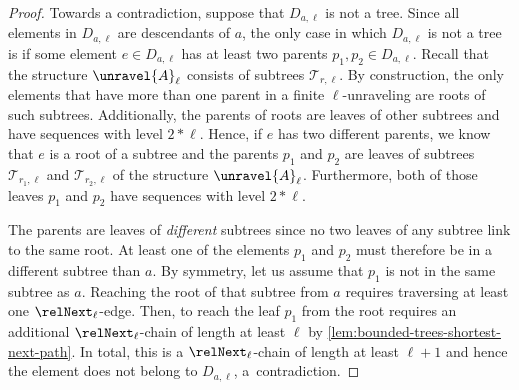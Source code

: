 \begin{proof}
  Towards a contradiction, suppose that $D_{a,\ell}$ is not a tree.
  Since all elements in $D_{a,\ell}$ are descendants of $a$, the only case in which $D_{a,\ell}$ is not a tree is if some element $e \in D_{a,\ell}$ has at least two parents $p_{1}, p_{2} \in D_{a,\ell}$.
  Recall that the structure $\unravel{A}_{\ell}$ consists of subtrees $\mathcal{T}_{r,\ell}$.
  By construction, the only elements that have more than one parent in a finite $\ell$-unraveling are roots of such subtrees.
  Additionally, the parents of roots are leaves of other subtrees and have sequences with level $2 * \ell$.
  Hence, if $e$ has two different parents, we know that $e$ is a root of a subtree and the parents $p_{1}$ and $p_{2}$ are leaves of subtrees $\mathcal{T}_{r_{1},\ell}$ and $\mathcal{T}_{r_{2},\ell}$ of the structure $\unravel{A}_{\ell}$.
  Furthermore, both of those leaves $p_{1}$ and $p_{2}$ have sequences with level $2 * \ell$.

  The parents are leaves of \emph{different} subtrees since no two leaves of any subtree link to the same root.
  At least one of the elements $p_{1}$ and $p_{2}$ must therefore be in a different subtree than $a$.
  By symmetry, let us assume that $p_{1}$ is not in the same subtree as $a$.
  Reaching the root of that subtree from $a$ requires traversing at least one $\relNext_{\ell}$-edge.
  Then, to reach the leaf $p_{1}$ from the root requires an additional $\relNext_{\ell}$-chain of length at least $\ell$ by \cref{lem:bounded-trees-shortest-next-path}.
  In total, this is a $\relNext_{\ell}$-chain of length at least $\ell + 1$ and hence the element does not belong to $D_{a,\ell}$, a~contradiction.
\end{proof}
\fi
